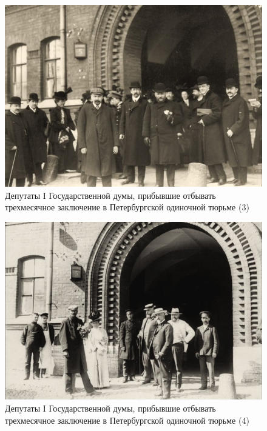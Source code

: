 \begin{figure}[h!tb] 
	\centering\includegraphics[scale=0.5]{Vozzvanie/ZOROnMVpx1c.jpg}
	\caption{Депутаты I Государственной думы, прибывшие отбывать трехмесячное заключение в Петербургской одиночной тюрьме (3)
	}%
\end{figure}
\begin{figure}[h!tb] 
	\centering\includegraphics[scale=0.5]{Vozzvanie/VJ5dQO_XYFo.jpg}
	\caption{Депутаты I Государственной думы, прибывшие отбывать трехмесячное заключение в Петербургской одиночной тюрьме (4)
	}%
\end{figure}
